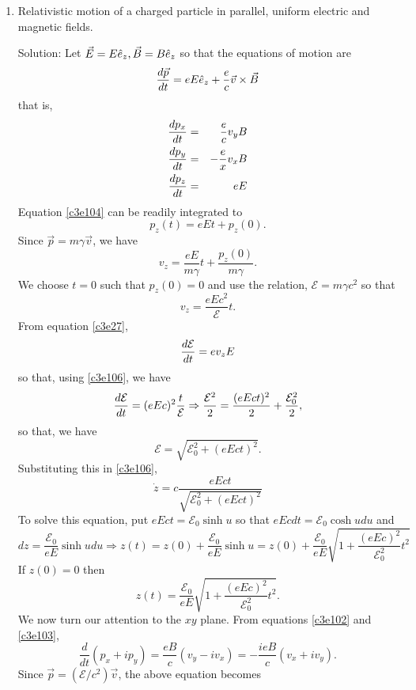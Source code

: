 \begin{enumerate}
\item Relativistic motion of a charged particle in parallel, uniform electric
and magnetic fields.
\item[Solution:] Let $\vec{E} = E\hat{e}_{z}, \vec{B} = B\hat{e}_{z}$ so that the equations
of motion are
\[
\frac{d{\vec{p}}}{d{t}} = eE\hat{e}_{z} + \frac{e}{c}\vec{v}\times\vec{B}
\]
that is,
\begin{eqnarray}
\frac{d{p_x}}{d{t}} &=& \frac{e}{c}v_yB \label{c3e103} \\
\frac{d{p_y}}{d{t}} &=& -\frac{e}{x}v_xB \label{c3e104} \\
\frac{d{p_z}}{d{t}} &=& eE \label{c3e105} 
\end{eqnarray}
Equation \eqref{c3e104} can be readily integrated to
\[
p_z(t) = eEt + p_z(0).
\]
Since $\vec{p} = m\gamma\vec{v}$, we have
\begin{equation}\label{c3e106} 
v_z = \frac{eE}{m\gamma}t + \frac{p_z(0)}{m\gamma}.
\end{equation}
We choose $t = 0$ such that $p_z(0) = 0$ and use the relation, 
$\mathcal{E} = m\gamma c^2$ so that
\begin{equation}\label{c3e107}
v_z = \frac{eEc^2}{\mathcal{E}}t.
\end{equation} 
From equation \eqref{c3e27},
\[
\frac{d{\mathcal{E}}}{d{t}} = ev_zE
\]
so that, using \eqref{c3e106}, we have 
\[
\frac{d{\mathcal{E}}}{d{t}} = (eEc)^2\frac{t}{\mathcal{E}} \Rightarrow
\frac{\mathcal{E}^2}{2} = \frac{(eEct)^2}{2} + \frac{\mathcal{E}_0^2}{2},
\]
so that, we have
\begin{equation}\label{c3e108}
\mathcal{E} = \sqrt{\mathcal{E}_0^2 + (eEct)^2}.
\end{equation}
Substituting this in \eqref{c3e106},
\[
\dot{z} = c\frac{eEct}{\sqrt{\mathcal{E}_0^2 + (eEct)^2}}
\]
To solve this equation, put $eEct = \mathcal{E}_0\sinh u$ so that $eEcdt = 
\mathcal{E}_0\cosh udu$ and
\[
dz = \frac{\mathcal{E}_0}{eE}\sinh udu \Rightarrow
z(t) = z(0) + \frac{\mathcal{E}_0}{eE}\sinh u = z(0) + \frac{\mathcal{E}_0}{eE}
\sqrt{1 + \frac{(eEc)^2}{\mathcal{E}_0^2}t^2}
\]
If $z(0) = 0$ then 
\begin{equation}\label{c3e109}
z(t) = \frac{\mathcal{E}_0}{eE}\sqrt{1 + \frac{(eEc)^2}{\mathcal{E}_0^2}t^2}.
\end{equation}
We now turn our attention to the $xy$ plane. From equations \eqref{c3e102} and
\eqref{c3e103},
\[
\frac{d}{dt}(p_x + ip_y) = \frac{eB}{c}(v_y - iv_x) = -\frac{ieB}{c}(v_x + iv_y).
\]
Since $\vec{p} = (\mathcal{E}/c^2)\vec{v}$, the above equation becomes
\begin{equation}\label{c3e110}

\end{equation}
\end{enumerate}
